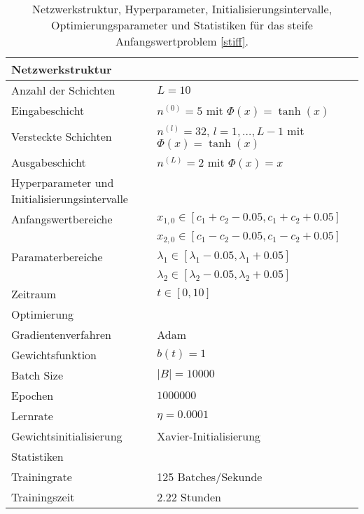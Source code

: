 \begin{table}
       \renewcommand{\arraystretch}{1.0}
       \centering
       \begin{tabular}{ l | l }
              \hline
              Netzwerkstruktur & \\
              \hline
              Anzahl der Schichten & $L=10$ \\
              Eingabeschicht & $n^{(0)}=5$ mit $\Phi(x)=\tanh(x)$ \\
              Versteckte Schichten & $n^{(l)}=32$, $l = 1, \dots, L-1$ mit $\Phi(x)=\tanh(x)$ \\
              Ausgabeschicht & $n^{(L)}=2$ mit $\Phi(x)=x$ \\
              \hline
              Hyperparameter und Initialisierungsintervalle & \\
              \hline
              Anfangswertbereiche &
              $x_{1,0} \in [c_1+c_2 - 0.05, c_1+c_2 + 0.05]$ \\
              & $x_{2,0} \in [c_1-c_2 - 0.05, c_1-c_2 + 0.05]$ \\
              Paramaterbereiche &
              $\lambda_1 \in [\lambda_1 - 0.05, \lambda_1 + 0.05]$ \\
              & $\lambda_2 \in[\lambda_2 - 0.05, \lambda_2 + 0.05]$ \\
              Zeitraum & $t \in [0, 10]$ \\
              \hline
              Optimierung & \\
              \hline
              Gradientenverfahren & Adam \\
              Gewichtsfunktion & $b(t)=1$ \\
              Batch Size & $|B|=10000$ \\
              Epochen & $1000000$ \\
              Lernrate & $\eta= 0.0001$ \\
              Gewichtsinitialisierung & Xavier-Initialisierung \\
              \hline
              Statistiken & \\
              \hline
              Trainingrate & 125 Batches/Sekunde \\
              Trainingszeit & 2.22 Stunden \\
              \hline
       \end{tabular}
       \caption{Netzwerkstruktur, Hyperparameter, Initialisierungsintervalle, Optimierungsparameter und Statistiken
       für das steife Anfangswertproblem \eqref{stiff}.}
       \label{stiff-table}
\end{table}
